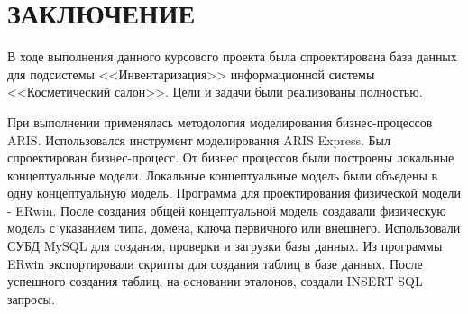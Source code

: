 {}
\section*{ЗАКЛЮЧЕНИЕ}

В ходе выполнения данного курсового проекта была спроектирована база данных
для подсистемы <<Инвентаризация>> информационной системы <<Косметический салон>>.
Цели и задачи были реализованы полностью.

При выполнении применялась методология моделирования бизнес-процессов ARIS.
Использовался инструмент моделирования ARIS Express.
Был спроектирован бизнес-процесс.
От бизнес процессов были построены локальные концептуальные модели.
Локальные концептуальные модель были объедены в одну концептуальную модель.
Программа для проектирования физической модели - ERwin.
После создания общей концептуальной модель создавали физическую модель с указанием
типа, домена, ключа первичного или внешнего.
Использовали СУБД MySQL для создания, проверки и загрузки базы данных.
Из программы ERwin экспортировали скрипты для создания таблиц в базе данных.
После успешного создания таблиц, на основании эталонов, создали INSERT SQL запросы.

\newpage
